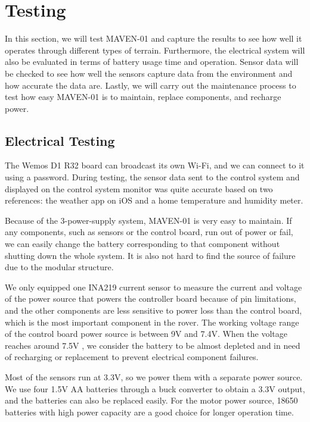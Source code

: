 \section{Testing}
In this section, we will test MAVEN-01 and capture the results to see how well it operates through
different types of terrain. Furthermore, the electrical system will also be evaluated in terms of battery usage time and operation. 
Sensor data will be checked to see how well the sensors capture data from the environment and how accurate the data are. Lastly, 
we will carry out the maintenance process to test how easy MAVEN-01 is to maintain, replace components, and recharge power.


\subsection{Electrical Testing}
\vspace{1em}
\par
The Wemos D1 R32 board can broadcast its own Wi-Fi, and we can connect to it using a password. During testing, the sensor data sent
to the control system and displayed on the control system monitor was quite accurate based on two references: the weather app on iOS 
and a home temperature and humidity meter.
\par
\vspace{0.5em}
Because of the 3-power-supply system, MAVEN-01 is very easy to maintain. 
If any components, such as sensors or the control board, run out of power or fail, 
we can easily change the battery corresponding to that component without shutting down the whole system. 
It is also not hard to find the source of failure due to the modular structure.

\vspace{0.5em}
\par
We only equipped one INA219 current sensor to measure the current and voltage 
of the power source that powers the controller board because of pin limitations, and 
the other components are less sensitive to power loss than the control board, which is the most important component 
in the rover. The working voltage range of the control board power source is between 9V and 7.4V. When the voltage reaches around 7.5V , we consider the 
battery to be almost depleted and in need of recharging or replacement to prevent electrical component failures.

\vspace{0.5em}
\par 
Most of the sensors run at 3.3V, so we power them with a separate power source. We use four 1.5V AA batteries through 
a buck converter to obtain a 3.3V output, and the batteries can also be replaced easily. For the motor power source, 18650 batteries with 
high power capacity are a good choice for longer operation time.


